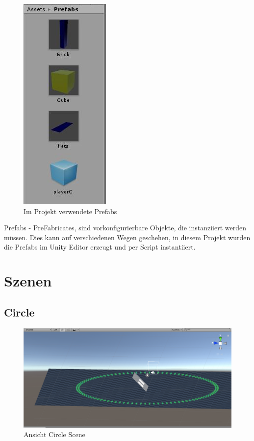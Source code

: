 \begin{figure}[h!]
	\centering
	\includegraphics[scale=1]{bilder/prefabs.jpg}
	\caption{Im Projekt verwendete Prefabs}
\end{figure}

Prefabs - PreFabricates, sind vorkonfigurierbare Objekte, die instanziiert werden müssen. Dies kann auf verschiedenen Wegen geschehen, in diesem Projekt wurden die Prefabs im Unity Editor erzeugt und per Script instantiiert.

\chapter{Szenen}

\section{Circle}
\label{Kreis}

\begin{figure}[h!]
	\includegraphics[scale=0.5]{bilder/CircleScene.png}
	\caption{Ansicht Circle Scene}
\end{figure}


